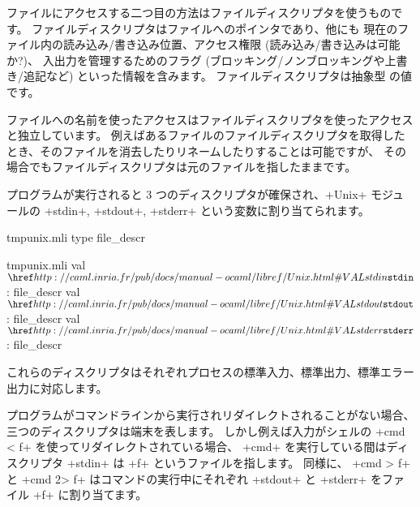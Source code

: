 ファイルにアクセスする二つ目の方法はファイルディスクリプタを使うものです。
ファイルディスクリプタはファイルへのポインタであり、他にも
現在のファイル内の読み込み/書き込み位置、アクセス権限 (読み込み/書き込みは可能か?)、
入出力を管理するためのフラグ (ブロッキング/ノンブロッキングや上書き/追記など)
といった情報を含みます。
ファイルディスクリプタは抽象型  の値です。

ファイルへの名前を使ったアクセスはファイルディスクリプタを使ったアクセスと独立しています。
例えばあるファイルのファイルディスクリプタを取得したとき、そのファイルを消去したりリネームしたりすることは可能ですが、
その場合でもファイルディスクリプタは元のファイルを指したままです。

プログラムが実行されると 3 つのディスクリプタが確保され、\ml+Unix+ モジュールの
\ml+stdin+, \ml+stdout+, \ml+stderr+ という変数に割り当てられます。
\begin{codefile}{tmpunix.mli}
type file_descr
\end{codefile}
\begin{listingcodefile}{tmpunix.mli}
val $\indexlibvalue{Unix}{stdin}$ : file_descr
val $\indexlibvalue{Unix}{stdout}$ : file_descr
val $\indexlibvalue{Unix}{stderr}$ : file_descr
\end{listingcodefile}
これらのディスクリプタはそれぞれプロセスの標準入力、標準出力、標準エラー出力に対応します。

プログラムがコマンドラインから実行されリダイレクトされることがない場合、
三つのディスクリプタは端末を表します。
しかし例えば入力がシェルの \ml+cmd < f+ を使ってリダイレクトされている場合、
\ml+cmd+ を実行している間はディスクリプタ \ml+stdin+ は \ml+f+ というファイルを指します。
同様に、 \ml+cmd > f+ と \ml+cmd 2> f+ はコマンドの実行中にそれぞれ \ml+stdout+ と \ml+stderr+ をファイル \ml+f+ に割り当てます。


